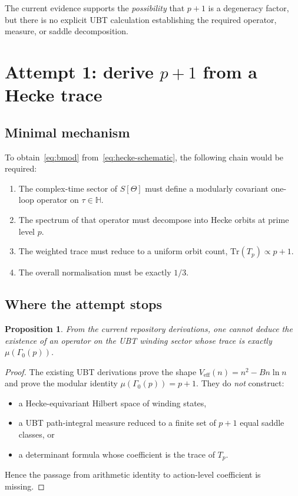 \documentclass[12pt,a4paper]{article}
\newtheorem{proposition}{Proposition}[section]
\theoremstyle{remark}
\begin{document}
\begin{insightbox}
The current evidence supports the \emph{possibility} that $p+1$ is a degeneracy
factor, but there is no explicit UBT calculation establishing the required
operator, measure, or saddle decomposition.
\end{insightbox}

\section{Attempt 1: derive $p+1$ from a Hecke trace}

\subsection{Minimal mechanism}

To obtain~\eqref{eq:bmod} from~\eqref{eq:hecke-schematic}, the following chain
would be required:
\begin{enumerate}
  \item The complex-time sector of $S[\Theta]$ must define a modularly covariant
        one-loop operator on $\tau\in\mathbb{H}$.
  \item The spectrum of that operator must decompose into Hecke orbits at prime
        level $p$.
  \item The weighted trace must reduce to a uniform orbit count,
        $\mathrm{Tr}(T_p)\propto p+1$.
  \item The overall normalisation must be exactly $1/3$.
\end{enumerate}

\subsection{Where the attempt stops}

\begin{proposition}
From the current repository derivations, one cannot deduce the existence of an
operator on the UBT winding sector whose trace is exactly $\mu(\Gamma_0(p))$.
\end{proposition}

\begin{proof}
The existing UBT derivations prove the shape $V_{\mathrm{eff}}(n)=n^2-Bn\ln n$
and prove the modular identity $\mu(\Gamma_0(p))=p+1$.  They do \emph{not}
construct:
\begin{itemize}
  \item a Hecke-equivariant Hilbert space of winding states,
  \item a UBT path-integral measure reduced to a finite set of $p+1$ equal
        saddle classes, or
  \item a determinant formula whose coefficient is the trace of $T_p$.
\end{itemize}
Hence the passage from arithmetic identity to action-level coefficient is
missing.
\end{proof}
\end{document}
